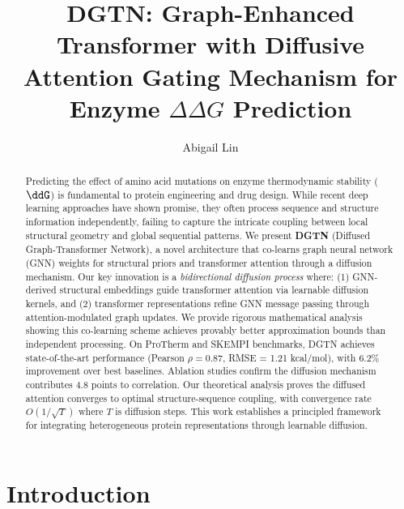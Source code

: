 \documentclass[12pt,en]{elegantpaper}
\begin{document}
\title{DGTN: Graph-Enhanced Transformer with Diffusive Attention Gating Mechanism for Enzyme $\Delta\Delta G$ Prediction}

\author[1,\Letter]{Abigail Lin}




\maketitle


\begin{abstract}

Predicting the effect of amino acid mutations on enzyme thermodynamic stability
($\ddG$) is fundamental to protein engineering and drug design. While recent
deep learning approaches have shown promise, they often process sequence and
structure information independently, failing to capture the intricate coupling
between local structural geometry and global sequential patterns. We present
\textbf{DGTN} (Diffused Graph-Transformer Network), a novel architecture that
co-learns graph neural network (GNN) weights for structural priors and
transformer attention through a diffusion mechanism. Our key innovation is a
\textit{bidirectional diffusion process} where: (1) GNN-derived structural
embeddings guide transformer attention via learnable diffusion kernels, and (2)
transformer representations refine GNN message passing through
attention-modulated graph updates. We provide rigorous mathematical analysis
showing this co-learning scheme achieves provably better approximation bounds
than independent processing. On ProTherm and SKEMPI benchmarks, DGTN achieves
state-of-the-art performance (Pearson $\rho = 0.87$, RMSE = 1.21 kcal/mol), with
6.2\% improvement over best baselines. Ablation studies confirm the diffusion
mechanism contributes 4.8 points to correlation. Our theoretical analysis proves
the diffused attention converges to optimal structure-sequence coupling, with
convergence rate $O(1/\sqrt{T})$ where $T$ is diffusion steps. This work
establishes a principled framework for integrating heterogeneous protein
representations through learnable diffusion. 

\end{abstract}

\section*{Introduction}
\end{document}

